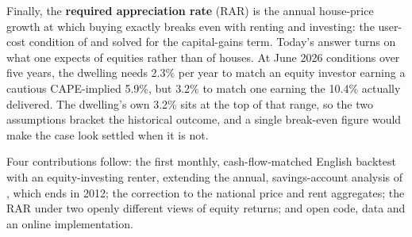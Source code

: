 Finally, the \textbf{required appreciation rate} (RAR) is the annual house-price growth at which buying exactly breaks even with renting and investing: the user-cost condition of \textcite{poterba1984} and \textcite{himmelberg2005} solved for the capital-gains term. Today's answer turns on what one expects of equities rather than of houses. At June 2026 conditions over five years, the dwelling needs 2.3\% per year to match an equity investor earning a cautious CAPE-implied 5.9\%, but 3.2\% to match one earning the 10.4\% actually delivered. The dwelling's own 3.2\% sits at the top of that range, so the two assumptions bracket the historical outcome, and a single break-even figure would make the case look settled when it is not.

Four contributions follow: the first monthly, cash-flow-matched English backtest with an equity-investing renter, extending the annual, savings-account analysis of \textcite{mostafa2019}, which ends in 2012; the correction to the national price and rent aggregates; the RAR under two openly different views of equity returns; and open code, data and an online implementation.
